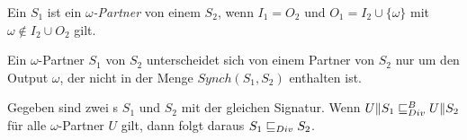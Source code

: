 \begin{Def}
  Ein \EIO{} $S_1$ ist ein \emph{$\omega$-Partner} von einem \EIO{} $S_2$, wenn
  $I_1=O_2$ und $O_1=I_2\cup\{\omega\}$ mit $\omega\notin I_2\cup O_2$ gilt.
\end{Def}

Ein $\omega$-Partner $S_1$ von $S_2$ unterscheidet sich von einem Partner von
$S_2$ nur um den Output $\omega$, der nicht in der Menge $Synch(S_1,S_2)$
enthalten ist.

\begin{lem}
\label{lemDivVerfeinerung}
  Gegeben sind zwei \EIO{}s $S_1$ und $S_2$ mit der gleichen Signatur. Wenn
  $U\|S_1\sqsubseteq _{Div}^B{} U\|S_2$ für alle $\omega$-Partner $U$ gilt, dann folgt daraus
  $S_1\sqsubseteq _{Div}{} S_2$.
\end{lem}

